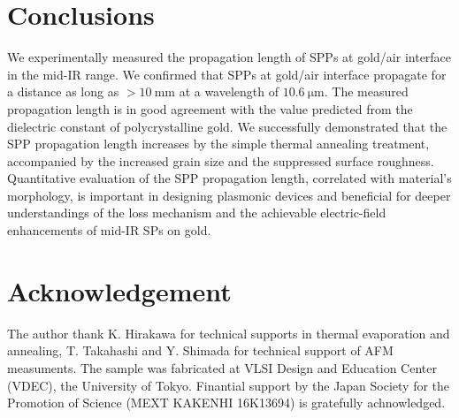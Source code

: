 \documentclass[aip,apl,reprint]{revtex4-1}
\begin{document}
\section{Conclusions}
\label{sec:conclusion}
We experimentally measured the propagation length of SPPs at gold/air interface in the mid-IR range. We confirmed that SPPs at gold/air interface propagate for a distance as long as $>10\:\mathrm{mm}$ at a wavelength of $10.6\:\mathrm{\mu m}$. The measured propagation length is in good agreement with the value predicted from the dielectric constant of polycrystalline gold. We successfully demonstrated that the SPP propagation length increases by the simple thermal annealing treatment, accompanied by the increased grain size and the suppressed surface roughness. Quantitative evaluation of the SPP propagation length, correlated with material's morphology, is important in designing plasmonic devices and beneficial for deeper understandings of the loss mechanism and the achievable electric-field enhancements of mid-IR SPs on gold.

\section*{Acknowledgement}
The author thank K. Hirakawa for technical supports in thermal evaporation and annealing, T. Takahashi and Y. Shimada for  technical support of AFM measuments.
The sample was fabricated at VLSI Design and Education Center (VDEC), the University of Tokyo. Finantial support by the Japan Society for the Promotion of Science (MEXT KAKENHI 16K13694) is gratefully achnowledged.



\newpage
\end{document}
